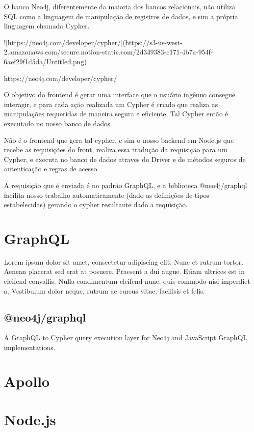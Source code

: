 O banco Neo4j, diferentemente da maioria dos bancos relacionais, não utiliza SQL como a linguagem de manipulação de registros de dados, e sim a própria linguagem chamada Cypher.

![https://neo4j.com/developer/cypher/](https://s3-us-west-2.amazonaws.com/secure.notion-static.com/2d349383-c171-4b7a-954f-6aef29f1d5da/Untitled.png)

https://neo4j.com/developer/cypher/

O objetivo do frontend é gerar uma interface que o usuário ingênuo consegue interagir, e para cada ação realizada um Cypher é criado que realiza as manipulações requeridas de maneira segura e eficiente. Tal Cypher então é executado no nosso banco de dados.

Não é o frontend que gera tal cypher, e sim o nosso backend em Node.js que recebe as requisições do front, realiza essa tradução da requisição para um Cypher, e executa no banco de dados atraves do Driver e de métodos seguros de autenticação e regras de acesso.

A requisição que é enviada é no padrão GraphQL, e a biblioteca @neo4j/graphql facilita nosso trabalho automaticamente (dado as definições de tipos estabelecidas) gerando o cypher resultante dado a requisição.
\section{GraphQL}

Lorem ipsum dolor sit amet, consectetur adipiscing elit. Nunc et rutrum tortor. Aenean placerat sed erat at posuere. Praesent a dui augue. Etiam ultrices est in eleifend convallis. Nulla condimentum eleifend nunc, quis commodo nisi imperdiet a. Vestibulum dolor neque, rutrum ac cursus vitae, facilisis et felis.

\subsection{@neo4j/graphql}
A GraphQL to Cypher query execution layer for Neo4j and JavaScript GraphQL implementations.

\section{Apollo}

\section{Node.js}

